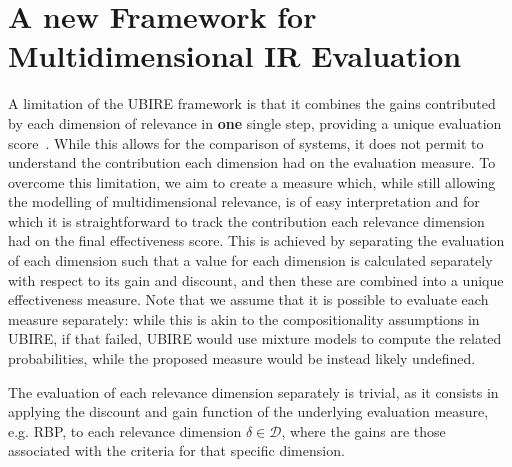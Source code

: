 
\section{A new Framework for Multidimensional IR Evaluation}
\label{sec:extension}

A limitation of the UBIRE framework is that it combines the gains contributed by each dimension of relevance in \textbf{one} single step, providing a unique evaluation score~\cite{zuccon14,zuccon16}.
While this allows for the comparison of systems, it does not permit to understand the contribution each dimension had on the evaluation measure. 
To overcome this limitation, we aim to create a measure which, while still allowing the modelling of multidimensional relevance, is of easy interpretation and for which it is straightforward to track the contribution each relevance dimension had on the final effectiveness score. This is achieved by separating the evaluation of each dimension such that a value for each dimension is calculated separately with respect to its gain and discount, and then these are combined into a unique effectiveness measure. Note that we assume that it is possible to evaluate each measure separately: while this is akin to the compositionality assumptions in UBIRE, if that failed, UBIRE would use mixture models to compute the related probabilities, while the proposed measure would be instead likely undefined. 

The evaluation of each relevance dimension separately is trivial, as it consists in applying the discount and gain function of the underlying evaluation measure, e.g. RBP, to each relevance dimension $\delta \in \mathcal{D}$, where the gains are those associated with the criteria for that specific dimension. 




